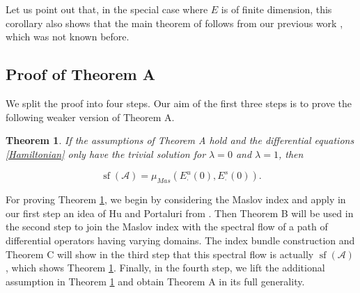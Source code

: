 \documentclass[a4paper,10pt]{article}
\newtheorem{theorem}{Theorem}[section]
\DeclareMathOperator{\sfl}{sf}
\begin{document}
\noindent 
Let us point out that, in the special case where $E$ is of finite dimension, this corollary also shows that the main theorem of \cite{Jacobo} follows from our previous work \cite{WaterstraatHomoclinics}, which was not known before. 








\subsection{Proof of Theorem A}\label{Section-ProofA}
We split the proof into four steps. Our aim of the first three steps is to prove the following weaker version of Theorem A.

\begin{theorem}\label{TheoremA-weak}
If the assumptions of Theorem A hold and the differential equations \eqref{Hamiltonian} only have the trivial solution for $\lambda=0$ and $\lambda=1$, then

\[\sfl(\mathcal{A})=\mu_{Mas}(E^u_\cdot(0),E^s_\cdot(0)).\]
\end{theorem}
\noindent
For proving Theorem \ref{TheoremA-weak}, we begin by considering the Maslov index and apply in our first step an idea of Hu and Portaluri from \cite{Hu}. Then Theorem B will be used in the second step to join the Maslov index with the spectral flow of a path of differential operators having varying domains. The index bundle construction and Theorem C will show in the third step that this spectral flow is actually $\sfl(\mathcal{A})$, which shows Theorem \ref{TheoremA-weak}. Finally, in the fourth step, we lift the additional assumption in Theorem \ref{TheoremA-weak} and obtain Theorem A in its full generality.





\end{document}
